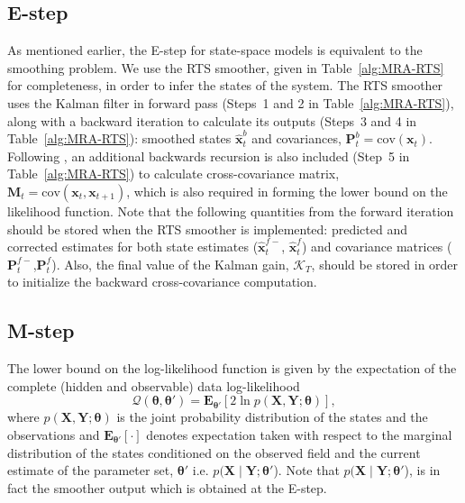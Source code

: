 \documentclass[review,authoryear,3p]{elsarticle}
\begin{document}
\subsection{E-step}
As mentioned earlier, the E-step for state-space models is equivalent to the smoothing problem. We use the RTS smoother, given in Table~\ref{alg:MRA-RTS} for completeness, in order to infer the states of the system. The RTS smoother uses the Kalman filter \citep{Kalman1960} in forward pass (Steps~1 and 2 in Table~\ref{alg:MRA-RTS}), along with a backward iteration to calculate its outputs (Steps~3 and 4 in Table~\ref{alg:MRA-RTS}): smoothed states $\hat{\mathbf x}^b_t$ and covariances, $\mathbf P^b_t=\mathrm{cov}(\mathbf{x}_t)$. Following \cite{Gibsona2005}, an additional backwards recursion is also included (Step~5 in Table~\ref{alg:MRA-RTS})	to calculate cross-covariance matrix, $\mathbf M_t=\mathrm{cov}(\mathbf{x}_{t},\mathbf{x}_{t+1})$, which is also required in forming the lower bound on the likelihood function. Note that the following quantities from the forward iteration should be stored when the RTS smoother is implemented: predicted and corrected estimates for both state estimates ($\hat{\mathbf{x}}_t^{f-}$, $\hat{\mathbf{x}}_t^{f}$) and covariance matrices ($\mathbf P_t^{f-}$,$\mathbf P_t^f$). Also, the final value of the Kalman gain, $\mathcal K_T$, should be stored in order to initialize the backward cross-covariance computation. 
 \subsection{M-step}
The lower bound on the log-likelihood function is given by the expectation of the complete (hidden and observable) data  log-likelihood \citep{Bishop2006} 
\begin{equation}\label{eq:Bishopbound}
	\mathcal Q(\boldsymbol \theta,\boldsymbol\theta')= \mathbf E_{\boldsymbol \theta'}\left[2\ln p(\mathbf X,\mathbf Y;\boldsymbol \theta)\right], 
\end{equation}
where $p(\mathbf X,\mathbf Y;\boldsymbol \theta)$ is the joint probability distribution of the states and the observations and $ \mathbf E_{\boldsymbol \theta'}\left[\cdot\right] $ denotes expectation taken with respect to the marginal distribution of the states conditioned on the observed field and the current estimate of the parameter set, $\boldsymbol\theta'$ i.e.  $p(\mathbf X\mid\mathbf Y;\boldsymbol \theta'$). Note that $p(\mathbf X\mid\mathbf Y;\boldsymbol \theta'$), is in fact the smoother output which is obtained at the E-step.
\end{document}
